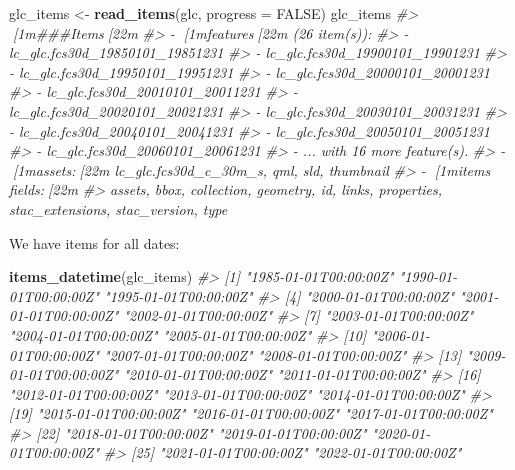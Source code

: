 \documentclass[
  graybox,natbib,nospthms]{svmono}
\newenvironment{Shaded}{\begin{snugshade}}{\end{snugshade}}
\newcommand{\AttributeTok}[1]{\textcolor[rgb]{0.27,0.27,0.27}{#1}}
\newcommand{\CommentTok}[1]{\textcolor[rgb]{0.37,0.37,0.37}{\textit{#1}}}
\newcommand{\ConstantTok}[1]{\textcolor[rgb]{0.37,0.37,0.37}{#1}}
\newcommand{\FunctionTok}[1]{\textcolor[rgb]{0.27,0.27,0.27}{\textbf{#1}}}
\newcommand{\NormalTok}[1]{#1}
\newcommand{\OtherTok}[1]{\textcolor[rgb]{0.37,0.37,0.37}{#1}}
\begin{document}
\begin{Shaded}
\begin{Highlighting}[]
\NormalTok{glc\_items }\OtherTok{\textless{}{-}} \FunctionTok{read\_items}\NormalTok{(glc, }\AttributeTok{progress =} \ConstantTok{FALSE}\NormalTok{)}
\NormalTok{glc\_items}
\CommentTok{\#\textgreater{} [1m\#\#\#Items[22m}
\CommentTok{\#\textgreater{} {-} [1mfeatures[22m (26 item(s)):}
\CommentTok{\#\textgreater{}   {-} lc\_glc.fcs30d\_19850101\_19851231}
\CommentTok{\#\textgreater{}   {-} lc\_glc.fcs30d\_19900101\_19901231}
\CommentTok{\#\textgreater{}   {-} lc\_glc.fcs30d\_19950101\_19951231}
\CommentTok{\#\textgreater{}   {-} lc\_glc.fcs30d\_20000101\_20001231}
\CommentTok{\#\textgreater{}   {-} lc\_glc.fcs30d\_20010101\_20011231}
\CommentTok{\#\textgreater{}   {-} lc\_glc.fcs30d\_20020101\_20021231}
\CommentTok{\#\textgreater{}   {-} lc\_glc.fcs30d\_20030101\_20031231}
\CommentTok{\#\textgreater{}   {-} lc\_glc.fcs30d\_20040101\_20041231}
\CommentTok{\#\textgreater{}   {-} lc\_glc.fcs30d\_20050101\_20051231}
\CommentTok{\#\textgreater{}   {-} lc\_glc.fcs30d\_20060101\_20061231}
\CommentTok{\#\textgreater{}   {-} ... with 16 more feature(s).}
\CommentTok{\#\textgreater{} {-} [1massets:[22m lc\_glc.fcs30d\_c\_30m\_s, qml, sld, thumbnail}
\CommentTok{\#\textgreater{} {-} [1mitem\textquotesingle{}s fields:[22m }
\CommentTok{\#\textgreater{} assets, bbox, collection, geometry, id, links, properties, stac\_extensions, stac\_version, type}
\end{Highlighting}
\end{Shaded}

We have items for all dates:

\begin{Shaded}
\begin{Highlighting}[]
\FunctionTok{items\_datetime}\NormalTok{(glc\_items)}
\CommentTok{\#\textgreater{}  [1] "1985{-}01{-}01T00:00:00Z" "1990{-}01{-}01T00:00:00Z" "1995{-}01{-}01T00:00:00Z"}
\CommentTok{\#\textgreater{}  [4] "2000{-}01{-}01T00:00:00Z" "2001{-}01{-}01T00:00:00Z" "2002{-}01{-}01T00:00:00Z"}
\CommentTok{\#\textgreater{}  [7] "2003{-}01{-}01T00:00:00Z" "2004{-}01{-}01T00:00:00Z" "2005{-}01{-}01T00:00:00Z"}
\CommentTok{\#\textgreater{} [10] "2006{-}01{-}01T00:00:00Z" "2007{-}01{-}01T00:00:00Z" "2008{-}01{-}01T00:00:00Z"}
\CommentTok{\#\textgreater{} [13] "2009{-}01{-}01T00:00:00Z" "2010{-}01{-}01T00:00:00Z" "2011{-}01{-}01T00:00:00Z"}
\CommentTok{\#\textgreater{} [16] "2012{-}01{-}01T00:00:00Z" "2013{-}01{-}01T00:00:00Z" "2014{-}01{-}01T00:00:00Z"}
\CommentTok{\#\textgreater{} [19] "2015{-}01{-}01T00:00:00Z" "2016{-}01{-}01T00:00:00Z" "2017{-}01{-}01T00:00:00Z"}
\CommentTok{\#\textgreater{} [22] "2018{-}01{-}01T00:00:00Z" "2019{-}01{-}01T00:00:00Z" "2020{-}01{-}01T00:00:00Z"}
\CommentTok{\#\textgreater{} [25] "2021{-}01{-}01T00:00:00Z" "2022{-}01{-}01T00:00:00Z"}
\end{Highlighting}
\end{Shaded}
\end{document}
